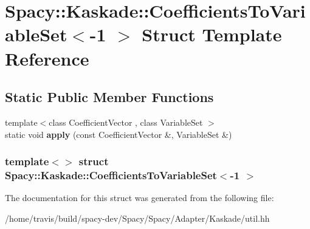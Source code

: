 \hypertarget{structSpacy_1_1Kaskade_1_1CoefficientsToVariableSet_3-1_01_4}{\section{\-Spacy\-:\-:\-Kaskade\-:\-:\-Coefficients\-To\-Variable\-Set$<$-\/1 $>$ \-Struct \-Template \-Reference}
\label{structSpacy_1_1Kaskade_1_1CoefficientsToVariableSet_3-1_01_4}
}
\subsection*{\-Static \-Public \-Member \-Functions}
\begin{DoxyCompactItemize}
\item 
\hypertarget{structSpacy_1_1Kaskade_1_1CoefficientsToVariableSet_3-1_01_4_a0cd221cfb9e6fb4d459e2f302a85e743}{{\footnotesize template$<$class Coefficient\-Vector , class Variable\-Set $>$ }\\static void {\bfseries apply} (const \-Coefficient\-Vector \&, \-Variable\-Set \&)}\label{structSpacy_1_1Kaskade_1_1CoefficientsToVariableSet_3-1_01_4_a0cd221cfb9e6fb4d459e2f302a85e743}

\end{DoxyCompactItemize}
\subsubsection*{template$<$$>$ struct Spacy\-::\-Kaskade\-::\-Coefficients\-To\-Variable\-Set$<$-\/1 $>$}



\-The documentation for this struct was generated from the following file\-:\begin{DoxyCompactItemize}
\item 
/home/travis/build/spacy-\/dev/\-Spacy/\-Spacy/\-Adapter/\-Kaskade/util.\-hh\end{DoxyCompactItemize}
